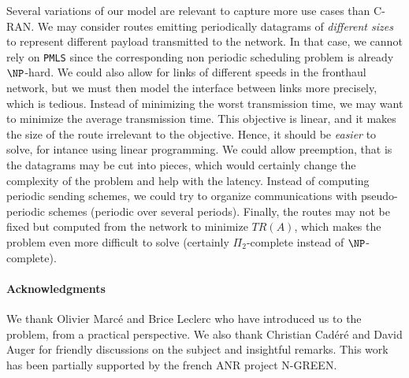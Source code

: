 \documentclass[a4paper,10pt]{article}
\newcommand\PMLS{\texttt{PMLS}\xspace}
\begin{document}
   	Several variations of our model are relevant to capture more use cases than C-RAN. 
   	We may consider routes emitting  periodically datagrams of \emph{different sizes} to represent different payload transmitted to the network. In that case, we cannot rely on \PMLS since the corresponding non periodic scheduling problem is already $\NP$-hard. 
   	We could also allow for links of different speeds in the fronthaul network, but we must then model
   	the interface between links more precisely, which is tedious.
	Instead of minimizing the worst transmission time, we may want to minimize the average transmission time. This objective is linear, and it makes the size of the route irrelevant to the objective. Hence, it should be \emph{easier} to solve, for intance using linear programming. We could allow preemption, that is the datagrams may be cut into pieces, which would certainly change the complexity of the problem and help with the latency.  
   	Instead of computing periodic sending schemes, we could try to organize communications with pseudo-periodic schemes (periodic over several periods). Finally, the routes may not be fixed but computed from the network to minimize $TR(A)$, which makes the problem even more difficult to solve (certainly $\Pi_2$-complete instead of $\NP$-complete). 



 	\paragraph*{Acknowledgments} 
 	We thank Olivier Marcé and Brice Leclerc who have introduced us to the problem, from a practical perspective. We also thank Christian Cad\'er\'e and David Auger for friendly discussions on the subject and insightful remarks. This work has been partially supported by the french ANR project N-GREEN.



\end{document}
